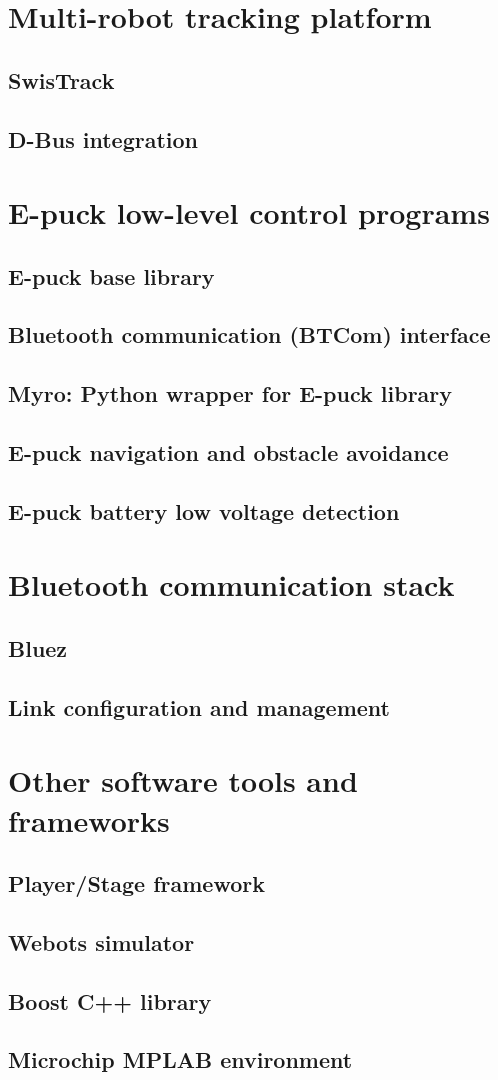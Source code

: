 \section{Multi-robot tracking platform}
\subsection{SwisTrack}
\subsection{D-Bus integration}
\section{E-puck low-level control programs}
\subsection{E-puck base library} 
\subsection{Bluetooth communication (BTCom) interface}
\subsection{Myro: Python wrapper for E-puck library}
\subsection{E-puck navigation and obstacle avoidance}
\subsection{E-puck battery low voltage detection}
\section{Bluetooth communication stack}
\subsection{Bluez}
\subsection{Link configuration and management}
\section{Other software tools and frameworks}
\subsection{Player/Stage framework}
\subsection{Webots simulator}
\subsection{Boost C++ library}
\subsection{Microchip MPLAB environment}